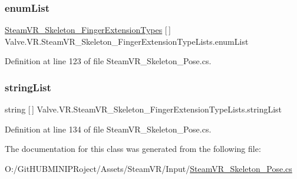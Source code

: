 \subsubsection{\texorpdfstring{enumList}{enumList}}
{\footnotesize\ttfamily \mbox{\hyperlink{namespace_valve_1_1_v_r_af4f7ce87893374f71b2fa2ba112642da}{Steam\+V\+R\+\_\+\+Skeleton\+\_\+\+Finger\+Extension\+Types}} \mbox{[}$\,$\mbox{]} Valve.\+V\+R.\+Steam\+V\+R\+\_\+\+Skeleton\+\_\+\+Finger\+Extension\+Type\+Lists.\+enum\+List\hspace{0.3cm}{\ttfamily [get]}}



Definition at line 123 of file Steam\+V\+R\+\_\+\+Skeleton\+\_\+\+Pose.\+cs.

\mbox{\label{class_valve_1_1_v_r_1_1_steam_v_r___skeleton___finger_extension_type_lists_ac8e933578ee155d66997fd6c01ae969b}} 
\subsubsection{\texorpdfstring{stringList}{stringList}}
{\footnotesize\ttfamily string \mbox{[}$\,$\mbox{]} Valve.\+V\+R.\+Steam\+V\+R\+\_\+\+Skeleton\+\_\+\+Finger\+Extension\+Type\+Lists.\+string\+List\hspace{0.3cm}{\ttfamily [get]}}



Definition at line 134 of file Steam\+V\+R\+\_\+\+Skeleton\+\_\+\+Pose.\+cs.



The documentation for this class was generated from the following file\+:\begin{DoxyCompactItemize}
\item 
O\+:/\+Git\+H\+U\+B\+M\+I\+N\+I\+P\+Roject/\+Assets/\+Steam\+V\+R/\+Input/\mbox{\hyperlink{_steam_v_r___skeleton___pose_8cs}{Steam\+V\+R\+\_\+\+Skeleton\+\_\+\+Pose.\+cs}}\end{DoxyCompactItemize}
